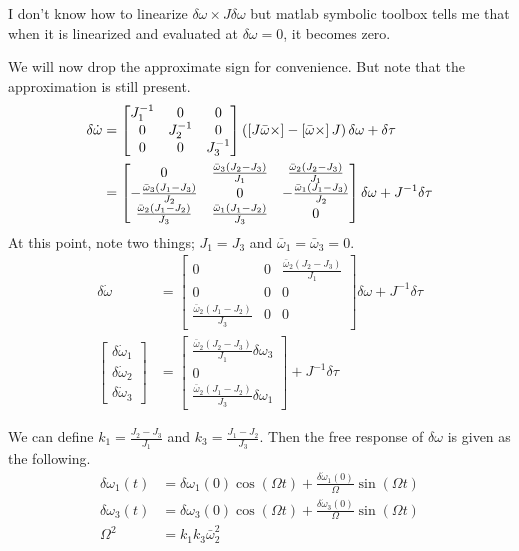 \documentclass[]{article}
\begin{document}
I don't know how to linearize $\delta \omega \times J \delta \omega$ but matlab symbolic toolbox tells me that when it is linearized and evaluated at $\delta \omega = 0$, it becomes zero.

We will now drop the approximate sign for convenience. But note that the approximation is still present.
\begin{align}
	\delta \dot{\omega} & = \begin{bmatrix}
	J_1^{-1} & 0 & 0 \\
	0 & J_2^{-1} & 0 \\
	0 & 0 & J_3^{-1}
	\end{bmatrix} \left( \left[ J \bar{\omega} \times \right] - \left[ \bar{\omega} \times \right] J \right) \delta \omega + \delta \tau \\
	& = \begin{bmatrix}
	0 & \frac{\bar{\omega}_3(J_2 - J_3)}{J_1} & \frac{\bar{\omega}_2(J_2 - J_3)}{J_1} \\
	-\frac{\bar{\omega}_3(J_1 - J_3)}{J_2} & 0 & -\frac{\bar{\omega}_1(J_1 - J_3)}{J_2} \\
	\frac{\bar{\omega}_2(J_1 - J_2)}{J_3} & \frac{\bar{\omega}_1(J_1 - J_2)}{J_3} & 0
	\end{bmatrix} \delta \omega + J^{-1}\delta \tau
\end{align}
At this point, note two things; $J_1 = J_3$ and $\bar{\omega}_1 = \bar{\omega}_3 = 0$.
\begin{align}
\delta \dot{\omega} & = \begin{bmatrix}
0 & 0 & \frac{\bar{\omega}_2(J_2 - J_3)}{J_1} \\
0 & 0 & 0 \\
\frac{\bar{\omega}_2(J_1 - J_2)}{J_3} & 0 & 0
\end{bmatrix} \delta \omega + J^{-1} \delta \tau \\
\begin{bmatrix}
\delta \dot{\omega}_1 \\
\delta \dot{\omega}_2 \\
\delta \dot{\omega}_3
\end{bmatrix} & = \begin{bmatrix}
\frac{\bar{\omega}_2(J_2 - J_3)}{J_1} \delta \omega_3 \\
0 \\
\frac{\bar{\omega}_2(J_1 - J_2)}{J_3} \delta \omega_1
\end{bmatrix} + J^{-1} \delta \tau
\end{align}

We can define $k_1 = \frac{J_2 - J_3}{J_1}$ and $k_3 = \frac{J_1 - J_2}{J_3}$. Then the free response of $\delta \omega$ is given as the following.
\begin{align}
	\delta \omega_1 (t) & = \delta \omega_1(0) \cos(\Omega t) + \frac{\delta \dot{\omega}_1 (0)}{\Omega} \sin(\Omega t) \\
	\delta \omega_3 (t) & = \delta \omega_3(0) \cos(\Omega t) + \frac{\delta \dot{\omega}_3 (0)}{\Omega} \sin(\Omega t) \\
	\Omega^2 & = k_1 k_3 \bar{\omega}_2^2
\end{align}
\end{document}
